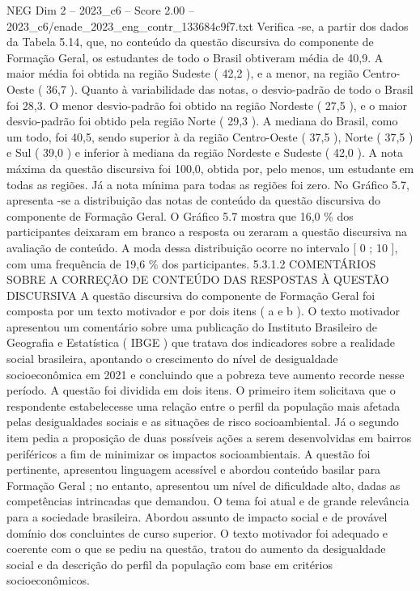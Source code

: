 \begin{textsample}{NEG Dim 2 – 2023\_c6 – Score 2.00 – 2023\_c6/enade\_2023\_eng\_contr\_133684c9f7.txt}
Verifica -se, a partir dos dados da Tabela 5.14, que, no conteúdo da questão discursiva do componente de Formação Geral, os estudantes de todo o Brasil obtiveram média de 40,9.
A maior média foi obtida na região Sudeste ( 42,2 ), e a menor, na região Centro-Oeste ( 36,7 ).
Quanto à variabilidade das notas, o desvio-padrão de todo o Brasil foi 28,3.
O menor desvio-padrão foi obtido na região Nordeste ( 27,5 ), e o maior desvio-padrão foi obtido pela região Norte ( 29,3 ).
A mediana do Brasil, como um todo, foi 40,5, sendo superior à da região Centro-Oeste ( 37,5 ), Norte ( 37,5 ) e Sul ( 39,0 ) e inferior à mediana da região Nordeste e Sudeste ( 42,0 ).
A nota máxima da questão discursiva foi 100,0, obtida por, pelo menos, um estudante em todas as regiões.
Já a nota mínima para todas as regiões foi zero.
No Gráfico 5.7, apresenta -se a distribuição das notas de conteúdo da questão discursiva do componente de Formação Geral.
O Gráfico 5.7 mostra que 16,0 \% dos participantes deixaram em branco a resposta ou zeraram a questão discursiva na avaliação de conteúdo.
A moda dessa distribuição ocorre no intervalo [ 0 ; 10 ], com uma frequência de 19,6 \% dos participantes. 5.3.1.2 COMENTÁRIOS SOBRE A CORREÇÃO DE CONTEÚDO DAS RESPOSTAS À QUESTÃO DISCURSIVA A questão discursiva do componente de Formação Geral foi composta por um texto motivador e por dois itens ( a e b ).
O texto motivador apresentou um comentário sobre uma publicação do Instituto Brasileiro de Geografia e Estatística ( IBGE ) que tratava dos indicadores sobre a realidade social brasileira, apontando o crescimento do nível de desigualdade socioeconômica em 2021 e concluindo que a pobreza teve aumento recorde nesse período.
A questão foi dividida em dois itens.
O primeiro item solicitava que o respondente estabelecesse uma relação entre o perfil da população mais afetada pelas desigualdades sociais e as situações de risco socioambiental.
Já o segundo item pedia a proposição de duas possíveis ações a serem desenvolvidas em bairros periféricos a fim de minimizar os impactos socioambientais.
A questão foi pertinente, apresentou linguagem acessível e abordou conteúdo basilar para Formação Geral ; no entanto, apresentou um nível de dificuldade alto, dadas as competências intrincadas que demandou.
O tema foi atual e de grande relevância para a sociedade brasileira.
Abordou assunto de impacto social e de provável domínio dos concluintes de curso superior.
O texto motivador foi adequado e coerente com o que se pediu na questão, tratou do aumento da desigualdade social e da descrição do perfil da população com base em critérios socioeconômicos.

\end{textsample}
